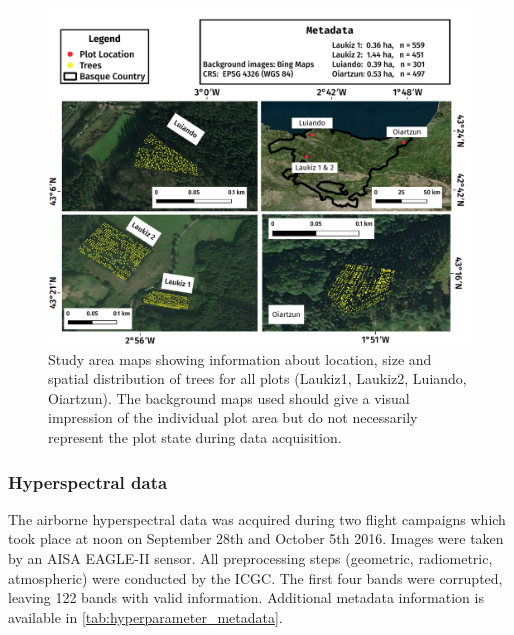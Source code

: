 \documentclass[remotesensing,article,submit,moreauthors,pdftex]{Definitions/mdpi}
\begin{document}
\begin{figure} [ht!]
	\begin{center}
		\centering
		\includegraphics[width=\textwidth] {study-area-hyperspectral.pdf}
		\caption{Study area maps showing information about location, size and spatial distribution of trees for all plots (Laukiz1, Laukiz2, Luiando, Oiartzun). The background maps used should give a visual impression of the individual plot area but do not necessarily represent the plot state during data acquisition.}\label{fig:study_area}
	\end{center}
\end{figure}


\subsubsection{Hyperspectral data}

The airborne hyperspectral data was acquired during two flight campaigns which took place at noon on September 28th and October 5th 2016.
Images were taken by an AISA EAGLE-II sensor.
All preprocessing steps (geometric, radiometric, atmospheric) were conducted by the \ac{ICGC}.
The first four bands were corrupted, leaving 122 bands with valid information.
Additional metadata information is available in \autoref{tab:hyperparameter_metadata}.
\end{document}

